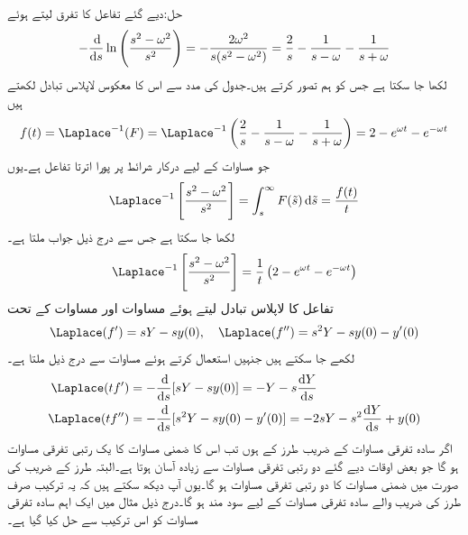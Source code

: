 حل:دیے گئے تفاعل کا تفرق لیتے ہوئے
\begin{align*}
-\frac{\dif}{\dif s}\ln\left(\frac{s^2-\omega^2}{s^2}\right)=-\frac{2\omega^2}{s(s^2-\omega^2)}=\frac{2}{s}-\frac{1}{s-\omega}-\frac{1}{s+\omega}
\end{align*}
لکھا جا سکتا ہے جس کو ہم  تصور کرتے ہیں۔جدول  کی مدد سے اس کا معکوس لاپلاس تبادل لکھتے ہیں
\begin{align*}
f(t)=\Laplace^{-1}(F)=\Laplace^{-1}\left(\frac{2}{s}-\frac{1}{s-\omega}-\frac{1}{s+\omega}\right)=2-e^{\omega t}-e^{-\omega t}
\end{align*} 
جو مساوات  کے لیے درکار شرائط پر پورا اترتا تفاعل ہے۔یوں
\begin{align*}
\Laplace^{-1}\left[\frac{s^2-\omega^2}{s^2}\right]=\int_{s}^{\infty}F(\tilde{s})\dif \tilde{s}=\frac{f(t)}{t}
\end{align*}
لکھا جا سکتا ہے جس سے درج ذیل جواب ملتا ہے۔
\begin{align*}
\Laplace^{-1}\left[\frac{s^2-\omega^2}{s^2}\right]=\frac{1}{t}\left(2-e^{\omega t}-e^{-\omega t}\right)
\end{align*}
تفاعل  کا لاپلاس تبادل  لیتے ہوئے مساوات  اور مساوات  کے تحت
\begin{align*}
\Laplace(f')=sY-sy(0),\quad \Laplace(f'')=s^2Y-sy(0)-y'(0)
\end{align*}
لکھے جا سکتے ہیں جنہیں استعمال کرتے ہوئے مساوات  سے درج ذیل ملتا ہے۔
\begin{gather}
\begin{aligned}\label{مساوات_لاپلاس_لاگیغ_الف}
\Laplace(tf')&=-\frac{\dif}{\dif s}[sY-sy(0)]=-Y-s\frac{\dif Y}{\dif s}\\
\Laplace(tf'')&=-\frac{\dif}{\dif s}[s^2Y-sy(0)-y'(0)]=-2sY-s^2\frac{\dif Y}{\dif s}+y(0)
\end{aligned}
\end{gather}
اگر سادہ تفرقی مساوات کے  ضریب   طرز کے ہوں تب اس کا ضمنی مساوات  کا یک رتبی تفرقی مساوات ہو گا جو بعض اوقات دیے گئے دو رتبی تفرقی مساوات سے زیادہ آسان ہوتا ہے۔البتہ  طرز کے  ضریب  کی صورت میں ضمنی مساوات  کا دو رتبی تفرقی مساوات ہو گا۔یوں آپ دیکھ سکتے ہیں کہ یہ ترکیب صرف  طرز کی  ضریب  والے سادہ تفرقی مساوات کے لیے سود مند ہو گا۔درج ذیل مثال میں ایک اہم سادہ تفرقی مساوات کو اس ترکیب سے حل کیا گیا ہے۔
